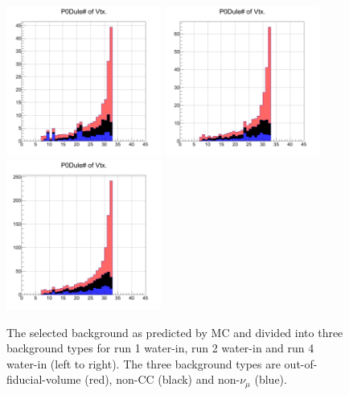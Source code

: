 \begin{figure}[h]
\centering
\includegraphics[width=2in]{Figures/TN100Plots/cBG1w.png}
\includegraphics[width=2in]{Figures/TN100Plots/cBG2w.png}
\includegraphics[width=2in]{Figures/TN100Plots/cBG4w.png}
\caption{The selected background as predicted by MC and divided into three background types for run 1 water-in, run 2 water-in and run 4 water-in (left to right). The three background types are out-of-fiducial-volume (red), non-CC (black) and non-$\nu_\mu$ (blue).}
\label{fig:xsbgrunw}
\end{figure}

